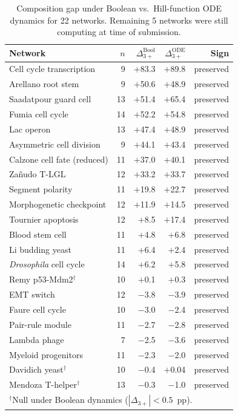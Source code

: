 \documentclass[10pt]{article}
\begin{document}
\begin{table}[h]
\centering
\caption{Composition gap under Boolean vs.\ Hill-function ODE
dynamics for 22 networks. Remaining 5 networks were still computing
at time of submission.}
\begin{tabular}{lrrrr}
\toprule
Network & $n$ & $\Delta_{3+}^{\mathrm{Bool}}$ & $\Delta_{3+}^{\mathrm{ODE}}$ & Sign \\
\midrule
Cell cycle transcription & 9 & $+$83.3 & $+$89.8 & preserved \\
Arellano root stem & 9 & $+$50.6 & $+$48.9 & preserved \\
Saadatpour guard cell & 13 & $+$51.4 & $+$65.4 & preserved \\
Fumia cell cycle & 14 & $+$52.2 & $+$54.8 & preserved \\
Lac operon & 13 & $+$47.4 & $+$48.9 & preserved \\
Asymmetric cell division & 9 & $+$44.1 & $+$43.4 & preserved \\
Calzone cell fate (reduced) & 11 & $+$37.0 & $+$40.1 & preserved \\
Za\~nudo T-LGL & 12 & $+$33.2 & $+$33.7 & preserved \\
Segment polarity & 11 & $+$19.8 & $+$22.7 & preserved \\
Morphogenetic checkpoint & 12 & $+$11.9 & $+$14.5 & preserved \\
Tournier apoptosis & 12 & $+$8.5 & $+$17.4 & preserved \\
Blood stem cell & 11 & $+$4.8 & $+$6.8 & preserved \\
Li budding yeast & 11 & $+$6.4 & $+$2.4 & preserved \\
\emph{Drosophila} cell cycle & 14 & $+$6.2 & $+$5.8 & preserved \\
Remy p53-Mdm2$^\dagger$ & 10 & $+$0.1 & $+$0.3 & preserved \\
EMT switch & 12 & $-$3.8 & $-$3.9 & preserved \\
Faure cell cycle & 10 & $-$3.0 & $-$2.4 & preserved \\
Pair-rule module & 11 & $-$2.7 & $-$2.8 & preserved \\
Lambda phage & 7 & $-$2.5 & $-$3.6 & preserved \\
Myeloid progenitors & 11 & $-$2.3 & $-$2.0 & preserved \\
Davidich yeast$^\dagger$ & 10 & $-$0.4 & $+$0.04 & preserved \\
Mendoza T-helper$^\dagger$ & 13 & $-$0.3 & $-$1.0 & preserved \\
\bottomrule
\multicolumn{5}{l}{\footnotesize $^\dagger$Null under Boolean dynamics ($|\Delta_{3+}| < 0.5$~pp).} \\
\end{tabular}
\end{table}
\end{document}
